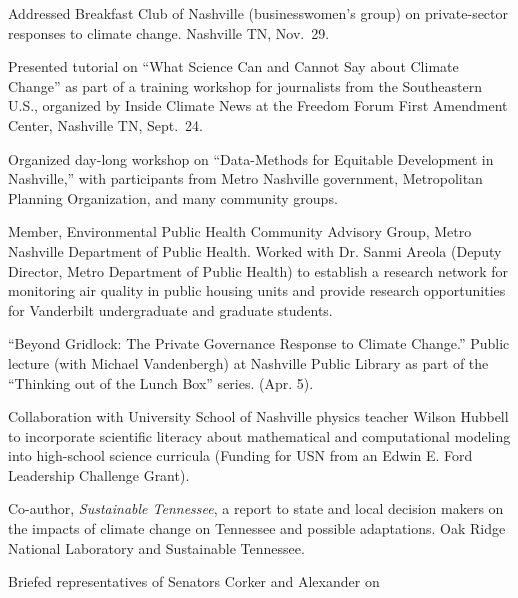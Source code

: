 \item[2018] Addressed Breakfast Club of Nashville (businesswomen's group) on
  private-sector responses to climate change. Nashville TN, Nov.\ 29.
\item[2018] Presented tutorial on ``What Science Can and Cannot Say about
  Climate Change'' as part of a training workshop for journalists from the
  Southeastern U.S., organized by Inside Climate News at the Freedom Forum
  First Amendment Center, Nashville TN, Sept.~24.
\item[2018] Organized day-long workshop on ``Data-Methods for Equitable
  Development in Nashville,'' with participants from Metro Nashville
  government, Metropolitan Planning Organization,
  and many community groups.
\item[2017--2019] Member, Environmental Public Health Community Advisory
  Group, Metro Nashville Department of Public Health. Worked with Dr. Sanmi
  Areola (Deputy Director, Metro Department of Public Health)
  to establish a research network for monitoring air quality in public housing
  units and provide research opportunities for Vanderbilt undergraduate and
  graduate students.
\item[2017] ``Beyond Gridlock: The Private Governance Response to Climate
  Change.'' Public lecture (with Michael Vandenbergh) at Nashville Public
  Library as part of the ``Thinking out of the Lunch Box'' series. (Apr. 5).
\item[2015--2017] Collaboration with University School of Nashville physics
  teacher Wilson Hubbell to incorporate scientific literacy about mathematical
  and computational modeling into high-school science curricula (Funding for
  USN from an Edwin E. Ford Leadership Challenge Grant).
\item[2011--2012] Co-author, \emph{Sustainable Tennessee}, a report to state
  and local decision makers on the impacts of climate change on Tennessee and
  possible adaptations. Oak Ridge National Laboratory and Sustainable Tennessee.
\item[2009] Briefed representatives of Senators Corker and Alexander on
